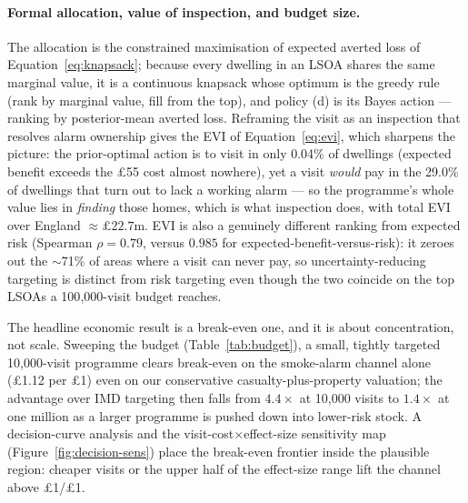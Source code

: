 \paragraph{Formal allocation, value of inspection, and budget size.}
The allocation is the constrained maximisation of expected averted loss of
Equation~\eqref{eq:knapsack}; because every dwelling in an LSOA shares the same
marginal value, it is a continuous knapsack whose optimum is the greedy rule (rank by
marginal value, fill from the top), and policy (d) is its Bayes action --- ranking by
posterior-mean averted loss. Reframing the visit as an inspection that resolves alarm
ownership gives the EVI of Equation~\eqref{eq:evi}, which sharpens the picture: the
prior-optimal action is to visit in only 0.04\% of dwellings (expected benefit exceeds
the \pounds55 cost almost nowhere), yet a visit \emph{would} pay in the 29.0\% of
dwellings that turn out to lack a working alarm --- so the programme's whole value lies
in \emph{finding} those homes, which is what inspection does, with total EVI over
England $\approx\pounds22.7$m. EVI is also a genuinely different ranking from expected
risk (Spearman $\rho=0.79$, versus $0.985$ for expected-benefit-versus-risk): it zeroes
out the $\sim$71\% of areas where a visit can never pay, so uncertainty-reducing
targeting is distinct from risk targeting even though the two coincide on the top LSOAs
a 100{,}000-visit budget reaches.

The headline economic result is a break-even one, and it is about concentration, not
scale. Sweeping the budget (Table~\ref{tab:budget}), a small, tightly targeted
10{,}000-visit programme clears break-even on the smoke-alarm channel alone
(\pounds1.12 per \pounds1) even on our conservative casualty-plus-property valuation;
the advantage over IMD targeting then falls from $4.4\times$ at 10{,}000 visits to
$1.4\times$ at one million as a larger programme is pushed down into lower-risk stock.
A decision-curve analysis and the visit-cost$\times$effect-size sensitivity map
(Figure~\ref{fig:decision-sens}) place the break-even frontier inside the plausible
region: cheaper visits or the upper half of the effect-size range lift the channel
above \pounds1/\pounds1.

